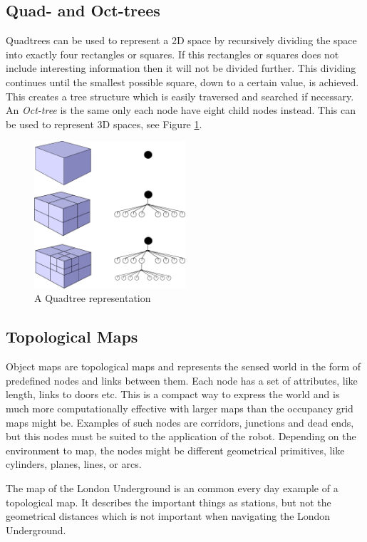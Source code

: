 \subsection{Quad- and Oct-trees}
Quadtrees can be used to represent a 2D space by recursively dividing the space into
exactly four rectangles or squares. If this rectangles or squares does not include
interesting information then it will not be divided further. This dividing continues until
the smallest possible square, down to a certain value, is achieved. This creates a tree structure which is easily
traversed and searched if necessary. An \emph{Oct-tree} is the same only each node have
eight child nodes instead. This can be used to represent 3D spaces, see Figure
\ref{chap2:fig-octtree}.
\begin{figure}[htbp]
    \centering
   \includegraphics[width=0.5\textwidth]{pics/octtree}
    \caption{A Quadtree representation}
    \label{chap2:fig-octtree}
\end{figure}
\cite{mathisen}


\subsection{Topological Maps}
Object maps are topological maps and represents the sensed world in the form of predefined nodes and links
between them. Each node has a set of attributes, like length, links to doors etc. This is
a compact way to express the world and is much more computationally effective with larger
maps than the occupancy grid maps might be. Examples of such nodes are corridors,
junctions and dead ends, but this nodes must be suited to the application of the robot.
Depending on the environment to map, the nodes might be different geometrical primitives,
like cylinders, planes, lines, or arcs. 

The map of the London Underground is an common every day example of a topological map. It describes
the important things as stations, but not the geometrical distances which is not important
when navigating the London Underground. \cite{thrun}


